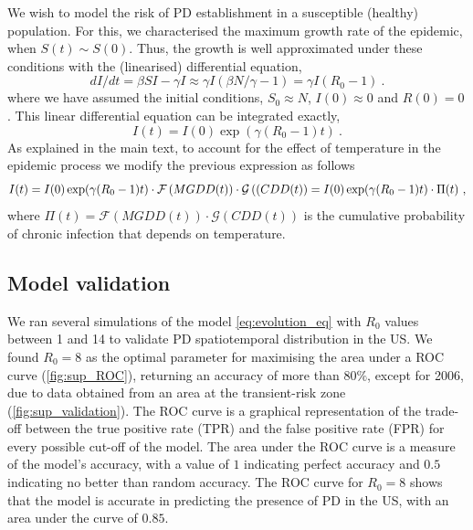 We wish to model the risk of PD establishment in a susceptible (healthy)
population. For this, we characterised the maximum growth rate of the epidemic,
when $S(t)\sim S(0)$. Thus, the growth is well approximated under these
conditions with
the (linearised) differential equation,
\begin{equation}
    dI/dt=\beta SI-\gamma I\approx \gamma I(\beta N/\gamma - 1)=\gamma
    I(R_0-1) \ .
\end{equation}
where we have assumed the initial conditions,
$S_0\approx N$, $I(0)\approx0$ and $R(0)=0$. This linear differential
equation can be integrated exactly,
\begin{equation}\label{eq: infect_proc}
    I(t)=I(0)\exp(\gamma(R_0-1)t) \ .
\end{equation}
As explained in the main text, to account for the effect of temperature in
the epidemic process we modify the previous expression as follows
\begin{equation}\label{eq: final_eq}
    I(t)=I(0)\exp(\gamma(R_0-1)t)\cdot \mathcal{F}\left(MGDD(t)\right)\cdot
    \mathcal{G}\left((CDD(t)\right)= I(0)\exp(\gamma(R_0-1)t)\cdot\Pi(t) \ ,
\end{equation}
where $\Pi(t)=\mathcal{F}(MGDD(t))\cdot \mathcal{G}(CDD(t))$ is the
cumulative probability of chronic infection that depends on temperature.

\subsection{Model validation}

We ran several simulations of the model \cref{eq:evolution_eq} with $R_0$
values between 1 and 14 to validate PD spatiotemporal distribution in the
US.
We found $R_0=8$ as the optimal parameter for maximising the area under a
ROC
curve (\cref{fig:sup_ROC}), returning an accuracy of more than $80 \%$,
except for 2006, due to data obtained from an area at the transient-risk
zone
(\cref{fig:sup_validation}). The ROC curve is a graphical representation of
the trade-off between the true positive rate (TPR) and the false positive
rate (FPR) for every possible cut-off of the model. The area under the ROC
curve is a measure of the model's accuracy, with a value of $1$ indicating
perfect accuracy and $0.5$ indicating no better than random accuracy. The
ROC curve for $R_0=8$ shows that the model is accurate in predicting the
presence of PD in the US, with an area under the curve of $0.85$.


